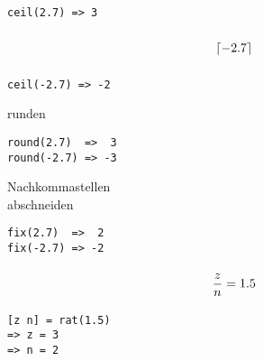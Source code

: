\documentclass
[
  fontsize = 11pt,
  parskip  = half-,
  BCOR     = 0pt,
  DIV      = 11,
  ngerman
]
{scrartcl}
\begin{document}
\hfill
\begin{minipage}{\cw}
\begin{verbatim}
ceil(2.7) => 3
\end{verbatim}
\end{minipage}
\begin{minipage}{\mw}
  \begin{equation*}
    \vphantom{\bigg(}%
    \lceil\num{-2.7}\rceil
  \end{equation*}
\end{minipage}%
\hfill
\begin{minipage}{\cw}
\begin{verbatim}
ceil(-2.7) => -2
\end{verbatim}
\end{minipage}

\begin{minipage}{\mw}
  \centering
  runden
\end{minipage}%
\hfill
\begin{minipage}{\cw}
\begin{verbatim}
round(2.7)  =>  3
round(-2.7) => -3
\end{verbatim}
\end{minipage}\bigskip

\begin{minipage}{\mw}
  \centering
  Nachkommastellen\\
  abschneiden
\end{minipage}%
\hfill
\begin{minipage}{\cw}
\begin{verbatim}
fix(2.7)  =>  2
fix(-2.7) => -2
\end{verbatim}
\end{minipage}\bigskip

\begin{minipage}{\mw}
  \begin{equation*}
    \vphantom{\bigg(}%
    \frac{z}{n}=\num{1.5}
  \end{equation*}
\end{minipage}%
\hfill
\begin{minipage}{\cw}
\begin{verbatim}
[z n] = rat(1.5)
=> z = 3
=> n = 2
\end{verbatim}
\end{minipage}

\end{document}
